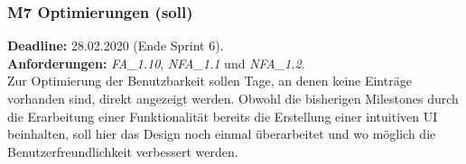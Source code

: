 \subsubsection*{M7 Optimierungen (soll)}
\textbf{Deadline: } 28.02.2020 (Ende Sprint 6). \\
\textbf{Anforderungen: }\emph{FA\_1.10}, \emph{NFA\_1.1} und \emph{NFA\_1.2}.\\
Zur Optimierung der Benutzbarkeit sollen Tage, an denen keine Einträge vorhanden sind, direkt angezeigt werden. Obwohl die bisherigen Milestones durch die Erarbeitung einer Funktionalität bereits die Erstellung einer intuitiven UI beinhalten, soll hier das Design noch einmal überarbeitet und wo möglich die Benutzerfreundlichkeit verbessert werden.
